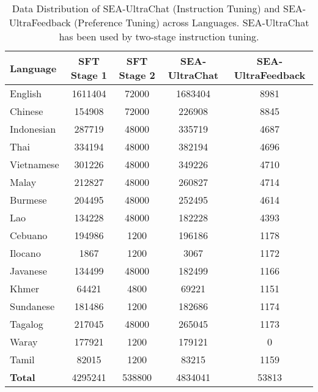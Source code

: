 \begin{table}[htbp]
\centering
\caption{Data Distribution of SEA-UltraChat (Instruction Tuning) and SEA-UltraFeedback (Preference Tuning) across Languages. SEA-UltraChat has been used by two-stage instruction tuning.}
\begin{tabular}{lcccc}
\toprule
\textbf{Language} & \textbf{SFT Stage 1} & \textbf{SFT Stage 2} & \textbf{SEA-UltraChat} & \textbf{SEA-UltraFeedback} \\
\midrule
English    & 1611404 & 72000  & 1683404 & 8981  \\
Chinese    & 154908  & 72000  & 226908  & 8845  \\
Indonesian & 287719  & 48000  & 335719  & 4687  \\
Thai       & 334194  & 48000  & 382194  & 4696  \\
Vietnamese & 301226  & 48000  & 349226  & 4710  \\
Malay      & 212827  & 48000  & 260827  & 4714  \\
Burmese    & 204495  & 48000  & 252495  & 4614  \\
Lao        & 134228  & 48000  & 182228  & 4393  \\
Cebuano    & 194986  & 1200   & 196186  & 1178  \\
Ilocano    & 1867    & 1200   & 3067    & 1172  \\
Javanese   & 134499  & 48000  & 182499  & 1166  \\
Khmer      & 64421   & 4800   & 69221   & 1151  \\
Sundanese  & 181486  & 1200   & 182686  & 1174  \\
Tagalog    & 217045  & 48000  & 265045  & 1173  \\
Waray      & 177921  & 1200   & 179121  & 0     \\
Tamil      & 82015   & 1200   & 83215   & 1159  \\
\midrule
\textbf{Total} & 4295241 & 538800 & 4834041 & 53813 \\
\bottomrule
\end{tabular}
\label{table:sft_data_distribution}
\end{table}
